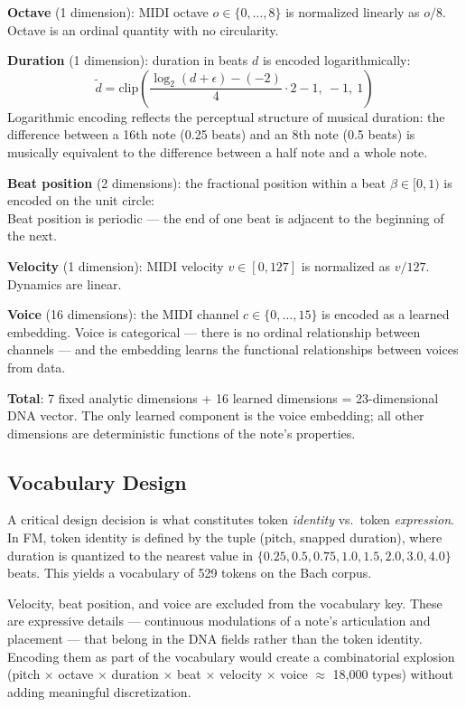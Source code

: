 \documentclass[11pt]{article}
\begin{document}
\textbf{Octave} (1 dimension): MIDI octave $o \in \{0, \ldots, 8\}$ is normalized linearly as $o / 8$. Octave is an ordinal quantity with no circularity.

\textbf{Duration} (1 dimension): duration in beats $d$ is encoded logarithmically:
\begin{equation}
\tilde{d} = \text{clip}\left(\frac{\log_2(d + \epsilon) - (-2)}{4} \cdot 2 - 1,\ -1,\ 1\right)
\end{equation}
Logarithmic encoding reflects the perceptual structure of musical duration: the difference between a 16th note (0.25 beats) and an 8th note (0.5 beats) is musically equivalent to the difference between a half note and a whole note.

\textbf{Beat position} (2 dimensions): the fractional position within a beat $\beta \in [0, 1)$ is encoded on the unit circle:
\begin{equation}
[\sin(2\pi \beta),\ \cos(2\pi \beta)]
\end{equation}
Beat position is periodic — the end of one beat is adjacent to the beginning of the next.

\textbf{Velocity} (1 dimension): MIDI velocity $v \in [0, 127]$ is normalized as $v / 127$. Dynamics are linear.

\textbf{Voice} (16 dimensions): the MIDI channel $c \in \{0, \ldots, 15\}$ is encoded as a learned embedding. Voice is categorical — there is no ordinal relationship between channels — and the embedding learns the functional relationships between voices from data.

\textbf{Total}: 7 fixed analytic dimensions + 16 learned dimensions = 23-dimensional DNA vector. The only learned component is the voice embedding; all other dimensions are deterministic functions of the note's properties.

\subsection{Vocabulary Design}

A critical design decision is what constitutes token \textit{identity} vs.\ token \textit{expression}. In FM, token identity is defined by the tuple (pitch, snapped duration), where duration is quantized to the nearest value in $\{0.25, 0.5, 0.75, 1.0, 1.5, 2.0, 3.0, 4.0\}$ beats. This yields a vocabulary of 529 tokens on the Bach corpus.

Velocity, beat position, and voice are excluded from the vocabulary key. These are expressive details — continuous modulations of a note's articulation and placement — that belong in the DNA fields rather than the token identity. Encoding them as part of the vocabulary would create a combinatorial explosion (pitch $\times$ octave $\times$ duration $\times$ beat $\times$ velocity $\times$ voice $\approx$ 18,000 types) without adding meaningful discretization.
\end{document}
